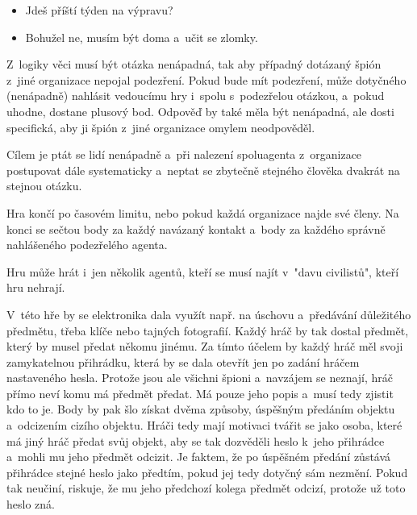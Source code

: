 \begin{itemize}
    \item Jdeš příští týden na výpravu?
    \item Bohužel ne, musím být doma a~učit se zlomky.
\end{itemize}

Z~logiky věci musí být otázka nenápadná, tak aby případný dotázaný špión z~jiné organizace nepojal podezření. Pokud bude mít podezření, může dotyčného (nenápadně) nahlásit vedoucímu hry i~spolu s~podezřelou otázkou, a~pokud uhodne, dostane plusový bod.
Odpověď by také měla být nenápadná, ale dosti specifická, aby ji špión z~jiné organizace omylem neodpověděl.

Cílem je ptát se lidí nenápadně a~při nalezení spoluagenta z~organizace postupovat dále systematicky a~neptat se zbytečně stejného člověka dvakrát na stejnou otázku.

Hra končí po časovém limitu, nebo pokud každá organizace najde své členy. Na konci se sečtou body za každý navázaný kontakt a~body za každého správně nahlášeného podezřelého agenta.

Hru může hrát i~jen několik agentů, kteří se musí najít v~"davu civilistů", kteří hru nehrají.

V~této hře by se elektronika dala využít např. na úschovu a~předávání důležitého předmětu, třeba klíče nebo tajných fotografií.
Každý hráč by tak dostal předmět, který by musel předat někomu jinému.
Za tímto účelem by každý hráč měl svoji zamykatelnou přihrádku, která by se dala otevřít jen po zadání hráčem nastaveného hesla.
Protože jsou ale všichni špioni a~navzájem se neznají, hráč přímo neví komu má předmět předat.
Má pouze jeho popis a~musí tedy zjistit kdo to je.
Body by pak šlo získat dvěma způsoby, úspěšným předáním objektu a~odcizením cizího objektu.
Hráči tedy mají motivaci tvářit se jako osoba, které má jiný hráč předat svůj objekt, aby se tak dozvěděli heslo k~jeho přihrádce a~mohli mu jeho předmět odcizit.
Je faktem, že po úspěšném předání zůstává přihrádce stejné heslo jako předtím, pokud jej tedy dotyčný sám nezmění.
Pokud tak neučiní, riskuje, že mu jeho předchozí kolega předmět odcizí, protože už toto heslo zná.


